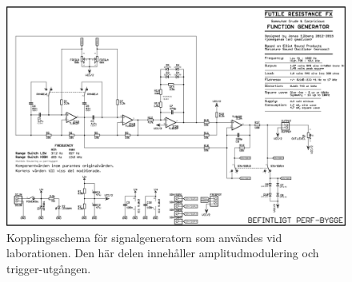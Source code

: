 \begin{figure}
  \centering
  \includegraphics[width=\linewidth]{img/signal-generator_schematic-2}
  \caption{Kopplingsschema för signalgeneratorn som användes vid laborationen.
           Den här delen innehåller amplitudmodulering och trigger-utgången.}
  \label{fig:siggen-schem-2}
\end{figure}

